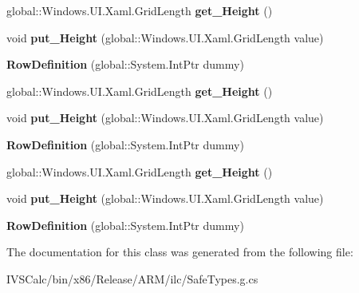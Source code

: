 \begin{DoxyCompactItemize}
global\+::\+Windows.\+U\+I.\+Xaml.\+Grid\+Length {\bfseries get\+\_\+\+Height} ()
\item 
\mbox{\label{class_windows_1_1_u_i_1_1_xaml_1_1_controls_1_1_row_definition_a3826d588ca5de7f3df890ce66232067e}} 
void {\bfseries put\+\_\+\+Height} (global\+::\+Windows.\+U\+I.\+Xaml.\+Grid\+Length value)
\item 
\mbox{\label{class_windows_1_1_u_i_1_1_xaml_1_1_controls_1_1_row_definition_acd2dd4c93ec858516dd0effd39d7ece1}} 
{\bfseries Row\+Definition} (global\+::\+System.\+Int\+Ptr dummy)
\item 
\mbox{\label{class_windows_1_1_u_i_1_1_xaml_1_1_controls_1_1_row_definition_a12f0fe7b4b6a4fbf872e443b2c0429be}} 
global\+::\+Windows.\+U\+I.\+Xaml.\+Grid\+Length {\bfseries get\+\_\+\+Height} ()
\item 
\mbox{\label{class_windows_1_1_u_i_1_1_xaml_1_1_controls_1_1_row_definition_a3826d588ca5de7f3df890ce66232067e}} 
void {\bfseries put\+\_\+\+Height} (global\+::\+Windows.\+U\+I.\+Xaml.\+Grid\+Length value)
\item 
\mbox{\label{class_windows_1_1_u_i_1_1_xaml_1_1_controls_1_1_row_definition_acd2dd4c93ec858516dd0effd39d7ece1}} 
{\bfseries Row\+Definition} (global\+::\+System.\+Int\+Ptr dummy)
\item 
\mbox{\label{class_windows_1_1_u_i_1_1_xaml_1_1_controls_1_1_row_definition_a12f0fe7b4b6a4fbf872e443b2c0429be}} 
global\+::\+Windows.\+U\+I.\+Xaml.\+Grid\+Length {\bfseries get\+\_\+\+Height} ()
\item 
\mbox{\label{class_windows_1_1_u_i_1_1_xaml_1_1_controls_1_1_row_definition_a3826d588ca5de7f3df890ce66232067e}} 
void {\bfseries put\+\_\+\+Height} (global\+::\+Windows.\+U\+I.\+Xaml.\+Grid\+Length value)
\item 
\mbox{\label{class_windows_1_1_u_i_1_1_xaml_1_1_controls_1_1_row_definition_acd2dd4c93ec858516dd0effd39d7ece1}} 
{\bfseries Row\+Definition} (global\+::\+System.\+Int\+Ptr dummy)
\end{DoxyCompactItemize}


The documentation for this class was generated from the following file\+:\begin{DoxyCompactItemize}
\item 
I\+V\+S\+Calc/bin/x86/\+Release/\+A\+R\+M/ilc/Safe\+Types.\+g.\+cs\end{DoxyCompactItemize}
